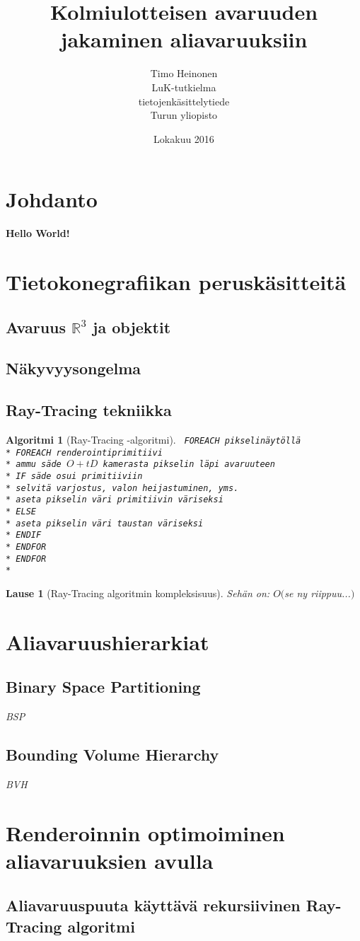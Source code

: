 \documentclass[a4paper,12pt, titlepage]{article}
\title{Kolmiulotteisen avaruuden jakaminen aliavaruuksiin}
\author{Timo Heinonen \\LuK-tutkielma \\ tietojenkäsittelytiede \\ Turun yliopisto}
\date{Lokakuu 2016}
\theoremstyle{break}
\newtheorem{lause}[maar]{Lause}
\theoremstyle{algostyle}
\newtheorem{alg}{Algoritmi}[section]
\newcommand{\R}{\mathbb{R}}
\newcommand{\tab}[1][1cm]{\hspace*{#1}} %
\newcommand{\code}[1]{\texttt{#1}} %
\begin{document}
\maketitle

\setcounter{tocdepth}{2} %
\tableofcontents

\newpage
\section{Johdanto}
\textbf{Hello World!}

\section{Tietokonegrafiikan peruskäsitteitä}
\subsection{Avaruus $\R ^3$ ja objektit} 
\subsection{Näkyvyysongelma}
\subsection{Ray-Tracing tekniikka}
\begin{alg}[Ray-Tracing -algoritmi]
\code{
FOREACH pikselinäytöllä \\*
\tab FOREACH renderointiprimitiivi \\*
\tab\tab ammu säde $O+tD$ kamerasta pikselin läpi avaruuteen \\*
\tab\tab IF säde osui primitiiviin \\*
\tab\tab\tab selvitä varjostus, valon heijastuminen, yms. \\*
\tab\tab\tab aseta pikselin väri primitiivin väriseksi \\*
\tab\tab ELSE \\*
\tab\tab\tab aseta pikselin väri taustan väriseksi \\*
\tab\tab ENDIF \\*
\tab ENDFOR \\*
ENDFOR\\*}
\end{alg}

\begin{lause}[Ray-Tracing algoritmin kompleksisuus]
Sehän on: $O($se ny riippuu...$)$ 
\end{lause}

\section{Aliavaruushierarkiat}
\subsection{Binary Space Partitioning}
\textit{BSP}
\subsection{Bounding Volume Hierarchy}
\textit{BVH}

\section{Renderoinnin optimoiminen aliavaruuksien avulla}
\subsection{Aliavaruuspuuta käyttävä rekursiivinen Ray-Tracing algoritmi}
\end{document}
